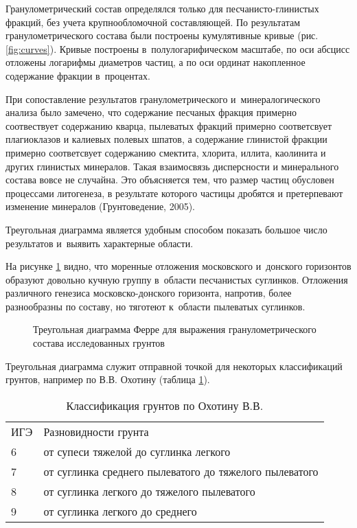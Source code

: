 Гранулометрический состав определялся только для песчанисто-глинистых фракций, без учета крупнообломочной составляющей.
По результатам гранулометрического состава были построены кумулятивные кривые (рис. \ref{fig:curves}).
Кривые построены в~полулогарифическом масштабе, 
по оси абсцисс отложены логарифмы диаметров частиц, 
а по оси ординат накопленное содержание фракции в~процентах.

{
\small

}

При сопоставление результатов гранулометрического и~минералогического анализа было замечено, 
что содержание песчаных фракция примерно соотвествует содержанию кварца, пылеватых фракций примерно соответсвует плагиоклазов и калиевых полевых шпатов, а содержание глинистой фракции примерно соответсвует содержанию смектита, хлорита, иллита, каолинита и других глинистых минералов.
Такая взаимосвязь дисперсности и минерального состава вовсе не случайна. Это объясняется тем, что размер частиц обусловен процессами литогенеза, в результате которого частицы дробятся и претерпевают изменение минералов (Грунтоведение, 2005)\cite{grunt2005}.

Треугольная диаграмма является удобным способом показать большое число результатов и~выявить характерные области.

На рисунке \ref{Fig:Ferre} видно, что моренные отложения московского и~донского горизонтов образуют довольно кучную группу в~области песчанистых суглинков.
Отложения различного генезиса московско-донского горизонта, напротив, более разнообразны по составу, но тяготеют к~области 
пылеватых суглинков.

\begin{figure}[ht]
    \centering
    \small
    
    \caption{Треугольная диаграмма Ферре для выражения гранулометрического состава исследованных грунтов}
    \label{Fig:Ferre}
\end{figure}

Треугольная диаграмма служит отправной точкой для некоторых классификаций грунтов, например по В.\;В. Охотину (таблица \ref{tab:oxot}).

\begin{table}[ht]
    \centering
    \small
    \caption{Классификация грунтов по Охотину В.\:В.} \label{tab:oxot}
    \renewcommand*{\arraystretch}{1.2}
    \begin{tabular}{p{}l}
    ИГЭ & Разновидности грунта \\
    6 \dotfill &  от супеси тяжелой до суглинка легкого \\
    7 \dotfill &  от суглинка среднего пылеватого до тяжелого пылеватого \\
    8 \dotfill &  от суглинка легкого до тяжелого пылеватого \\
    9 \dotfill &  от суглинка легкого до среднего \\
    \end{tabular}
\end{table}

